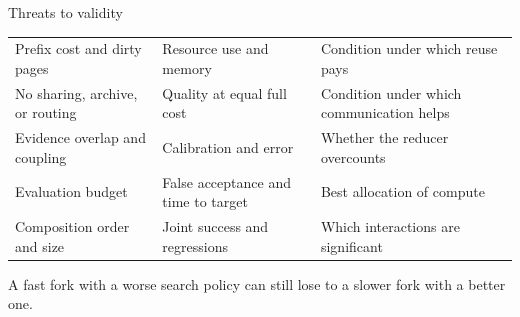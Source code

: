 \begin{frame}[t]{\ev{\tagP\,\tagO}Threats to validity}
{\small
\begin{tabularx}{\textwidth}{@{}L{4.3cm}YY@{}}
\toprule
{} &  & \\\midrule
Prefix cost and dirty pages & Resource use and memory & Condition under which reuse pays\\
No sharing, archive, or routing & Quality at equal full cost & Condition under which communication helps\\
Evidence overlap and coupling & Calibration and error & Whether the reducer overcounts\\
Evaluation budget & False acceptance and time to target & Best allocation of compute\\
Composition order and size & Joint success and regressions & Which interactions are significant\\\bottomrule
\end{tabularx}\par}
\vspace{.1cm}
{\small A fast fork with a worse search policy can still lose to a slower fork with a better one.\par}
\end{frame}
